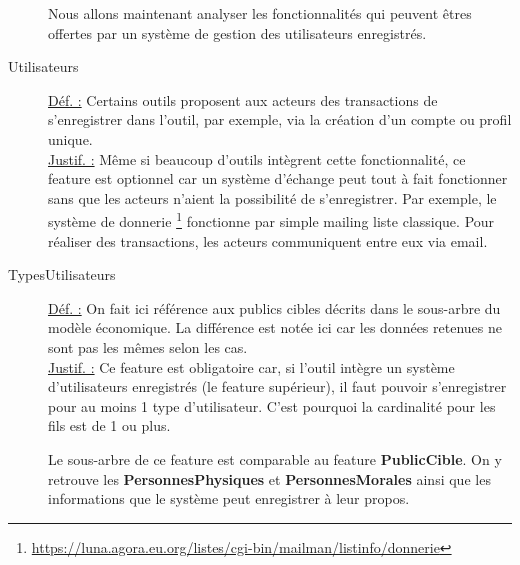\begin{description}
Nous allons maintenant analyser les fonctionnalités qui peuvent êtres offertes par un système de gestion des utilisateurs enregistrés.

\begin{center}
\end{center}

\item [Utilisateurs]
\label{featUtils} 
\underline{Déf. :}  Certains outils proposent aux acteurs des transactions de s'enregistrer dans l'outil,  par exemple,  via la création d'un compte ou profil unique.  
\\ \underline{Justif. :}  Même si beaucoup d'outils intègrent cette fonctionnalité,  ce feature est optionnel car un système d'échange peut tout à fait fonctionner sans que les acteurs n'aient la possibilité de s'enregistrer.  Par exemple,  le système de donnerie \footnote{\href{https://luna.agora.eu.org/listes/cgi-bin/mailman/listinfo/donnerie}{https://luna.agora.eu.org/listes/cgi-bin/mailman/listinfo/donnerie}} fonctionne par simple mailing liste classique.  Pour réaliser des transactions,  les acteurs communiquent entre eux via email.
\newline

\item [TypesUtilisateurs]
\underline{Déf. :}  On fait ici référence aux publics cibles décrits dans le sous-arbre du modèle économique.  La différence est notée ici car les données retenues ne sont pas les mêmes selon les cas.
\\ \underline{Justif. :}  Ce feature est obligatoire car,  si l'outil intègre un système d'utilisateurs enregistrés (le feature supérieur),  il faut pouvoir s'enregistrer pour au moins 1 type d'utilisateur.   C'est pourquoi la cardinalité pour les fils est de 1 ou plus.
\newline

Le sous-arbre de ce feature est comparable au feature \textbf{PublicCible}.  On y retrouve les \textbf{PersonnesPhysiques} et \textbf{PersonnesMorales} ainsi que les informations que le système peut enregistrer à leur propos.


\end{description}
